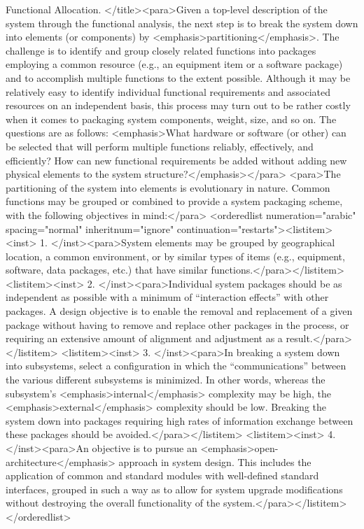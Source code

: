 Functional Allocation. </title><para>Given a top-level description of the system through the functional analysis, the next step is to break the system down into elements (or components) by <emphasis>partitioning</emphasis>. The challenge is to identify and group closely related functions into packages employing a common resource (e.g., an equipment item or a software package) and to accomplish multiple functions to the extent possible. Although it may be relatively easy to identify individual functional requirements and associated resources on an independent basis, this process may turn out to be rather costly when it comes to packaging system components, weight, size, and so on. The questions are as follows: <emphasis>What hardware or software (or other) can be selected that will perform multiple functions reliably, effectively, and efficiently? How can new functional requirements be added without adding new physical elements to the system structure?</emphasis></para>
<para>The partitioning of the system into elements is evolutionary in nature. Common functions may be grouped or combined to provide a system packaging scheme, with the following objectives in mind:</para>
<orderedlist numeration="arabic" spacing="normal" inheritnum="ignore" continuation="restarts"><listitem><inst>	1.	</inst><para>System elements may be grouped by geographical location, a common environment, or by similar types of items (e.g., equipment, software, data packages, etc.) that have similar functions.</para></listitem>
<listitem><inst>	2.	</inst><para>Individual system packages should be as independent as possible with a minimum of “interaction effects” with other packages. A design objective is to enable the removal and replacement of a given package without having to remove and replace other packages in the process, or requiring an extensive amount of alignment and adjustment as a result.</para></listitem>
<listitem><inst>	3.	</inst><para>In breaking a system down into subsystems, select a configuration in which the “communications” between the various different subsystems is minimized. In other words, whereas the subsystem’s <emphasis>internal</emphasis> complexity may be high, the <emphasis>external</emphasis> complexity should be low. Breaking the system down into packages requiring high rates of information exchange between these packages should be avoided.</para></listitem>
<listitem><inst>	4.	</inst><para>An objective is to pursue an <emphasis>open-architecture</emphasis> approach in system design. This includes the application of common and standard modules with well-defined standard interfaces, grouped in such a way as to allow for system upgrade modifications without destroying the overall functionality of the system.</para></listitem></orderedlist>

